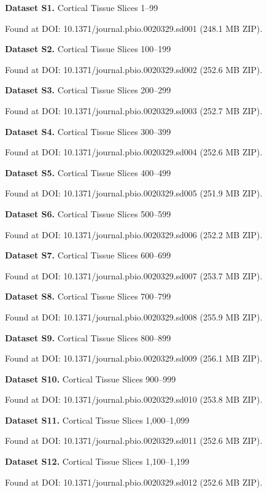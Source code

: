 \documentclass{article}
\begin{document}
\noindent \textbf{Dataset S1.} Cortical Tissue Slices 1–99\par
\noindent Found at DOI: 10.1371/journal.pbio.0020329.sd001 (248.1 MB ZIP).

\noindent \textbf{Dataset S2.} Cortical Tissue Slices 100–199\par
\noindent Found at DOI: 10.1371/journal.pbio.0020329.sd002 (252.6 MB ZIP).

\noindent \textbf{Dataset S3.} Cortical Tissue Slices 200–299\par
\noindent Found at DOI: 10.1371/journal.pbio.0020329.sd003 (252.7 MB ZIP).

\noindent \textbf{Dataset S4.} Cortical Tissue Slices 300–399\par
\noindent Found at DOI: 10.1371/journal.pbio.0020329.sd004 (252.6 MB ZIP).

\noindent \textbf{Dataset S5.} Cortical Tissue Slices 400–499\par
\noindent Found at DOI: 10.1371/journal.pbio.0020329.sd005 (251.9 MB ZIP).

\noindent \textbf{Dataset S6.} Cortical Tissue Slices 500–599\par
\noindent Found at DOI: 10.1371/journal.pbio.0020329.sd006 (252.2 MB ZIP).

\noindent \textbf{Dataset S7.} Cortical Tissue Slices 600–699\par
\noindent Found at DOI: 10.1371/journal.pbio.0020329.sd007 (253.7 MB ZIP).

\noindent \textbf{Dataset S8.} Cortical Tissue Slices 700–799\par
\noindent Found at DOI: 10.1371/journal.pbio.0020329.sd008 (255.9 MB ZIP).

\noindent \textbf{Dataset S9.} Cortical Tissue Slices 800–899\par
\noindent Found at DOI: 10.1371/journal.pbio.0020329.sd009 (256.1 MB ZIP).

\noindent \textbf{Dataset S10.} Cortical Tissue Slices 900–999\par
\noindent Found at DOI: 10.1371/journal.pbio.0020329.sd010 (253.8 MB ZIP).

\noindent \textbf{Dataset S11.} Cortical Tissue Slices 1,000–1,099\par
\noindent Found at DOI: 10.1371/journal.pbio.0020329.sd011 (252.6 MB ZIP).

\noindent \textbf{Dataset S12.} Cortical Tissue Slices 1,100–1,199\par
\noindent Found at DOI: 10.1371/journal.pbio.0020329.sd012 (252.6 MB ZIP).
\end{document}
